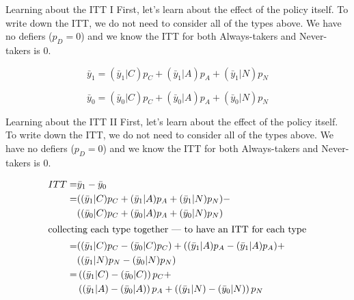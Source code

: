\documentclass[
  ignorenonframetext,
]{beamer}
\begin{document}
\begin{frame}{Learning about the ITT I}
\protect\hypertarget{learning-about-the-itt-i}{}
First, let's learn about the effect of the policy itself. To write down
the ITT, we do not need to consider all of the types above. We have no
defiers (\(p_D=0\)) and we know the ITT for both Always-takers and
Never-takers is 0.

\begin{equation}
\bar{y}_{1}=(\bar{y}_{1}|C)p_C + (\bar{y}_{1}|A)p_A + (\bar{y}_1|N)p_N
\end{equation}

\begin{equation}
\bar{y}_{0}=(\bar{y}_{0}|C)p_C + (\bar{y}_{0}|A)p_A + (\bar{y}_{0}|N)p_N
\end{equation}
\end{frame}

\begin{frame}{Learning about the ITT II}
\protect\hypertarget{learning-about-the-itt-ii}{}
First, let's learn about the effect of the policy itself. To write down
the ITT, we do not need to consider all of the types above. We have no
defiers (\(p_D=0\)) and we know the ITT for both Always-takers and
Never-takers is 0.

\begin{align}
ITT    = & \bar{y}_{1} - \bar{y}_{0} \\
        = & ( (\bar{y}_{1}|C)p_C + (\bar{y}_{1}|A)p_A + (\bar{y}_1|N)p_N ) - \\
       & ( (\bar{y}_{0}|C)p_C + (\bar{y}_{0}|A)p_A + (\bar{y}_{0}|N)p_N )  \\
       \intertext{collecting each type together --- to have an ITT for each type}
       = & ( (\bar{y}_{1}|C)p_C -  (\bar{y}_{0}|C)p_C )  +   ( (\bar{y}_{1}|A)p_A - (\bar{y}_{1}|A)p_A ) + \\
       & ( (\bar{y}_1|N)p_N  - (\bar{y}_{0}|N)p_N ) \\
       = & \left( (\bar{y}_{1}|C) -  (\bar{y}_{0}|C) \right)p_C   +  \\
       & \left( (\bar{y}_{1}|A)- (\bar{y}_{0}|A) \right)p_A  +  \left( (\bar{y}_1|N) - (\bar{y}_{0}|N) \right)p_N
\end{align}
\end{frame}
\end{document}
